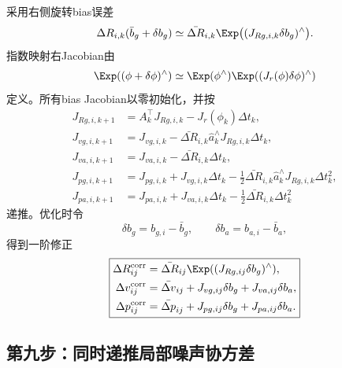 采用右侧旋转bias误差
\[
    \Delta R_{i,k}(\bar b_g+\delta b_g)
    \simeq
    \bar{\Delta R}_{i,k}
    \Exp\bigl((J_{R g,i,k}\delta b_g)^\wedge\bigr).
\]
指数映射右Jacobian由
\[
    \Exp((\phi+\delta\phi)^\wedge)
    \simeq
    \Exp(\phi^\wedge)
    \Exp((J_r(\phi)\delta\phi)^\wedge)
\]
定义。所有bias Jacobian以零初始化，并按
\[
\boxed{
\begin{aligned}
    J_{R g,i,k+1}
    &=A_k^\top J_{R g,i,k}
      -J_r(\phi_k)\Delta t_k,\\
    J_{v g,i,k+1}
    &=J_{v g,i,k}
      -\bar{\Delta R}_{i,k}\widehat a_k^\wedge
       J_{R g,i,k}\Delta t_k,\\
    J_{v a,i,k+1}
    &=J_{v a,i,k}
      -\bar{\Delta R}_{i,k}\Delta t_k,\\
    J_{p g,i,k+1}
    &=J_{p g,i,k}+J_{v g,i,k}\Delta t_k
      -\frac12\bar{\Delta R}_{i,k}\widehat a_k^\wedge
       J_{R g,i,k}\Delta t_k^2,\\
    J_{p a,i,k+1}
    &=J_{p a,i,k}+J_{v a,i,k}\Delta t_k
      -\frac12\bar{\Delta R}_{i,k}\Delta t_k^2
\end{aligned}
}
\]
递推。优化时令
\[
    \delta b_g=b_{g,i}-\bar b_g,
    \qquad
    \delta b_a=b_{a,i}-\bar b_a,
\]
得到一阶修正
\[
\boxed{
\begin{aligned}
    \Delta R_{ij}^{\mathrm{corr}}
    &=\bar{\Delta R}_{ij}
      \Exp((J_{R g,ij}\delta b_g)^\wedge),\\
    \Delta v_{ij}^{\mathrm{corr}}
    &=\bar{\Delta v}_{ij}
      +J_{v g,ij}\delta b_g+J_{v a,ij}\delta b_a,\\
    \Delta p_{ij}^{\mathrm{corr}}
    &=\bar{\Delta p}_{ij}
      +J_{p g,ij}\delta b_g+J_{p a,ij}\delta b_a.
\end{aligned}
}
\]

\subsection*{第九步：同时递推局部噪声协方差}

